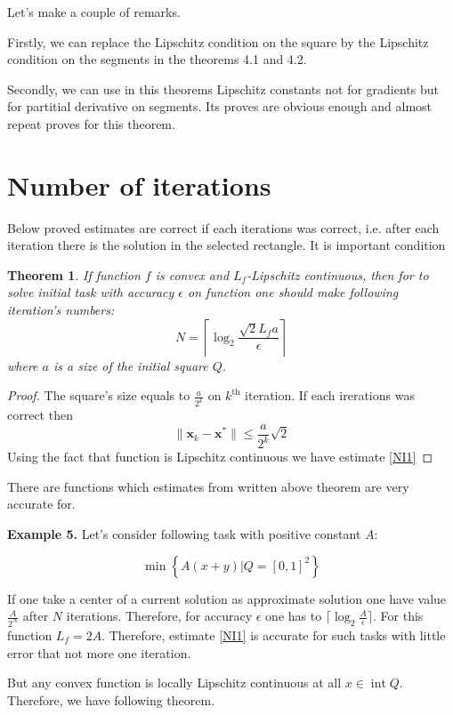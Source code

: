 \documentclass[12pt]{article}
\newtheorem{theorem}{Theorem}[section]
\DeclareMathOperator{\intt}{int}
\begin{document}
Let's make a couple of remarks.

Firstly, we can replace the Lipschitz condition on the square by the Lipschitz condition on the segments in the theorems 4.1 and 4.2.

Secondly, we can use in this theorems Lipschitz constants not for gradients but for partitial derivative on segments. Its proves are obvious enough and almost repeat proves for this theorem.

\section{Number of iterations}

Below proved estimates are correct if each iterations was correct, i.e. after each iteration there is the solution in the selected rectangle. It is important condition

\begin{theorem}
If function $f$ is convex and $L_f$-Lipschitz continuous, then for to solve initial task with accuracy $\epsilon$ on function one should make following iteration's numbers:
\begin{equation}\label{NI1}N = \left\lceil\log_2\frac{\sqrt{2}L_fa}{\epsilon}\right\rceil\end{equation}
where $a$ is a size of the initial square $Q$.
\end{theorem}

\begin{proof}
The square's size equals to $\frac{a}{2^k}$ on $k^\text{th}$ iteration. If each irerations was correct then
$$\|\textbf{x}_k-\textbf{x}^*\|\leq \frac{a}{2^k}\sqrt{2}$$
Using the fact that function is Lipschitz continuous we have estimate \ref{NI1}
\end{proof}

There are functions which estimates from written above theorem are very accurate for.

\textbf{Example 5.} Let's consider following task with positive constant $A$:

$$\min\left\{A(x+y)|Q = [0,1]^2\right\}$$

If one take a center of a current solution as approximate  solution one have value $\frac{A}{2^N}$ after $N$ iterations. Therefore, for accuracy $\epsilon$ one has to $\lceil\log_2\frac{A}{\epsilon}\rceil$. For this function $L_f = 2A$. Therefore, estimate \eqref{NI1} is accurate for such tasks with little error that not more one iteration.

But any convex function is locally Lipschitz continuous at all $x \in \intt Q$. Therefore, we have following theorem.
\end{document}
